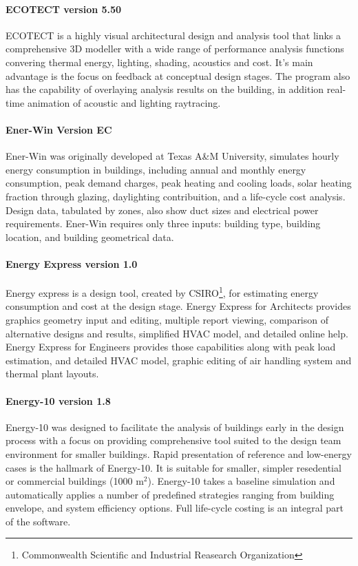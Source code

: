 \paragraph{ECOTECT version 5.50} ECOTECT is a highly visual architectural design and analysis tool that links a comprehensive 3D modeller with a wide range of performance analysis functions convering thermal energy, lighting, shading, acoustics and cost. It's main advantage is the focus on feedback at conceptual design stages. The program also has the capability of overlaying analysis results on the building, in addition real-time animation of acoustic and lighting raytracing.

\paragraph{Ener-Win Version EC} Ener-Win was originally developed at Texas A\&M University, simulates hourly energy consumption in buildings, including annual and monthly energy consumption, peak demand charges, peak heating and cooling loads, solar heating fraction through glazing, daylighting contribuition, and a life-cycle cost analysis. Design data, tabulated by zones, also show duct sizes and electrical power requirements. Ener-Win requires only three inputs: building type, building location, and building geometrical data.

\paragraph{Energy Express version 1.0} Energy express is a design tool, created by CSIRO\footnote{Commonwealth Scientific and Industrial Reasearch Organization}, for estimating energy consumption and cost at the design stage. Energy Express for Architects provides graphics geometry input and editing, multiple report viewing, comparison of alternative designs and results, simplified HVAC model, and detailed online help. Energy Express for Engineers provides those capabilities along with peak load estimation, and detailed HVAC model, graphic editing of air handling system and thermal plant layouts.

\paragraph{Energy-10 version 1.8} Energy-10 was designed to facilitate the analysis of buildings early in the design process with a focus on providing comprehensive tool suited to the design team environment for smaller buildings. Rapid presentation of reference and low-energy cases is the hallmark of Energy-10. It is suitable for smaller, simpler resedential or commercial buildings (1000 m$^2$). Energy-10 takes a baseline simulation and automatically applies a number of predefined strategies ranging from building envelope, and system efficiency options. Full life-cycle costing is an integral part of the software.

